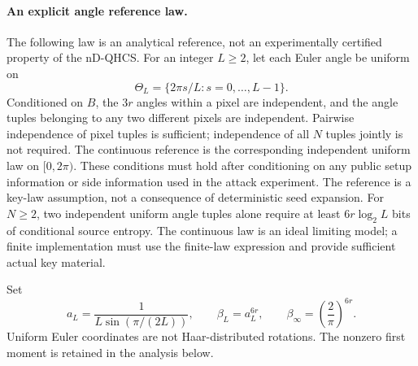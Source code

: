\documentclass[11pt,a4paper]{article}
\begin{document}
{\paragraph{An explicit angle reference law.}
The following law is an analytical reference, not an experimentally
certified property of the nD-QHCS. For an integer $L\geq2$, let each
Euler angle be uniform on
\begin{equation}
 \Theta_L=\{2\pi s/L:s=0,\ldots,L-1\}.
\end{equation}
Conditioned on $B$, the $3r$ angles within a pixel are independent,
and the angle tuples belonging to any two different pixels are
independent. Pairwise independence of pixel tuples is sufficient;
independence of all $N$ tuples jointly is not required. The continuous
reference is the corresponding independent uniform law on $[0,2\pi)$.
These conditions must hold after conditioning on any public setup
information or side information used in the attack experiment.
The reference is a key-law assumption, not a consequence of deterministic
seed expansion. For $N\geq2$, two independent uniform angle tuples alone
require at least $6r\log_2L$ bits of conditional source entropy. The
continuous law is an ideal limiting model; a finite implementation must
use the finite-law expression and provide sufficient actual key material.

Set
\begin{equation}
\label{eq:qef_beta_definition}
 a_L=\frac{1}{L\sin(\pi/(2L))},\qquad
 \beta_L=a_L^{6r},\qquad
 \beta_{\infty}=\left(\frac{2}{\pi}\right)^{6r}.
\end{equation}
Uniform Euler coordinates are not Haar-distributed rotations. The
nonzero first moment is retained in the analysis below.

}
\end{document}
